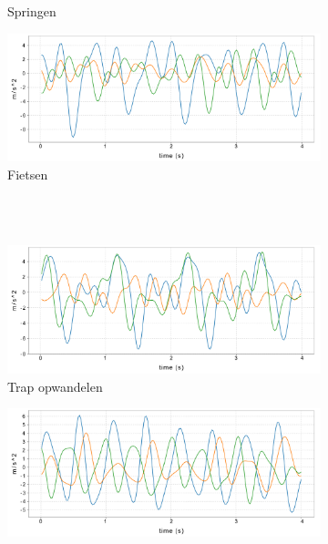 \documentclass{article}
\providecommand{\DIFaddbeginFL}{} %
\providecommand{\DIFaddendFL}{} %
\providecommand{\DIFdelbeginFL}{} %
\providecommand{\DIFdelendFL}{} %
\begin{document}
\begin{figure}[h!]
\begin{subfigure}[b]{.49\linewidth}
    \DIFaddendFL \caption{Springen}\label{fig:1c}
  \end{subfigure}
  \begin{subfigure}[b]{.49\linewidth}
    \centering
    \DIFdelbeginFL %
\DIFdelendFL \DIFaddbeginFL \includegraphics[width=.80\textwidth]{figures/fietsen}
    \DIFaddendFL \caption{Fietsen}\label{fig:1d}
  \end{subfigure} \\~\\
  \begin{subfigure}[b]{.49\linewidth}
    \centering
    \DIFdelbeginFL %
\DIFdelendFL \DIFaddbeginFL \includegraphics[width=.80\textwidth]{figures/trapop}
    \DIFaddendFL \caption{Trap opwandelen}\label{fig:1e}
  \end{subfigure} 
  \begin{subfigure}[b]{.49\linewidth}
    \centering 
    \DIFdelbeginFL %
\DIFdelendFL \DIFaddbeginFL \includegraphics[width=.80\textwidth]{figures/trapaf}

\end{subfigure}
\end{figure}
\end{document}
